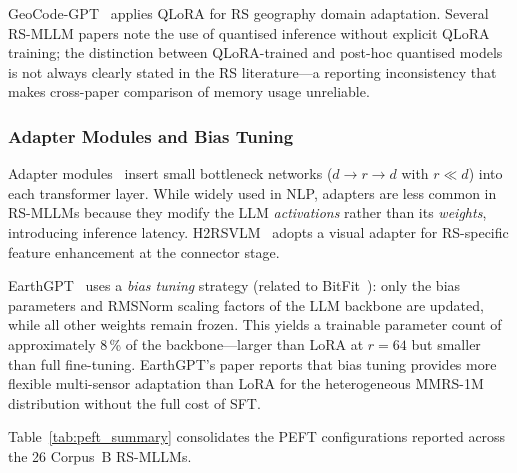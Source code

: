 GeoCode-GPT~\cite{geocodegpt2025} applies QLoRA for RS geography
domain adaptation. Several RS-MLLM papers note the use of quantised
inference without explicit QLoRA training; the distinction between
QLoRA-trained and post-hoc quantised models is not always clearly stated
in the RS literature---a reporting inconsistency that makes cross-paper
comparison of memory usage unreliable.

\subsubsection{Adapter Modules and Bias Tuning}\label{sec6:adapters}

Adapter modules~\cite{houlsby2019adapters} insert small bottleneck
networks ($d \to r \to d$ with $r \ll d$) into each transformer layer.
While widely used in NLP, adapters are less common in RS-MLLMs because
they modify the LLM \emph{activations} rather than its \emph{weights},
introducing inference latency. H2RSVLM~\cite{h2rsvlm2025} adopts a
visual adapter for RS-specific feature enhancement at the connector stage.

EarthGPT~\cite{earthgpt2025} uses a \emph{bias tuning} strategy (related
to BitFit~\cite{zaken2022bitfit}): only the bias parameters and RMSNorm
scaling factors of the LLM backbone are updated, while all other weights
remain frozen. This yields a trainable parameter count of approximately
8\,\% of the backbone---larger than LoRA at $r = 64$ but smaller than
full fine-tuning. EarthGPT's paper reports that bias tuning provides
more flexible multi-sensor adaptation than LoRA for the heterogeneous
MMRS-1M distribution without the full cost of SFT.

Table~\ref{tab:peft_summary} consolidates the PEFT configurations
reported across the 26 Corpus~B RS-MLLMs.

